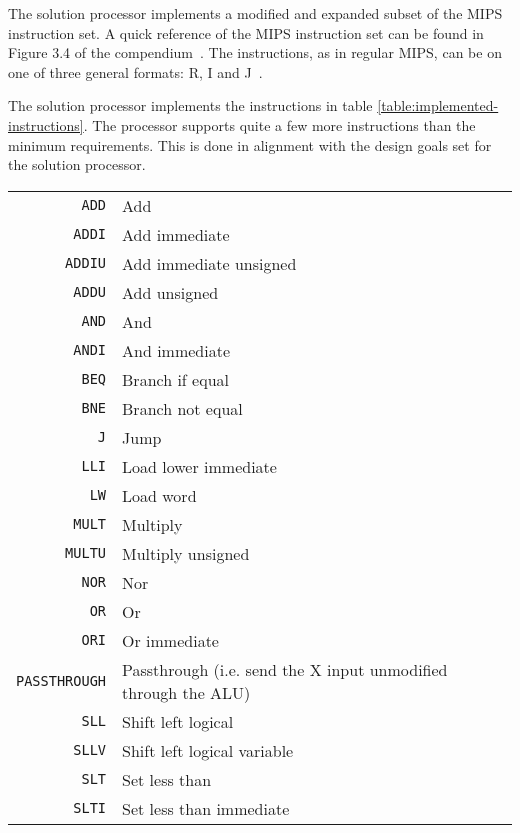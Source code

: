 The solution processor implements a modified and expanded subset of the MIPS instruction set.
A quick reference of the MIPS instruction set can be found in Figure 3.4 of the compendium~\cite[p.112]{compendium}.
The instructions, as in regular MIPS, can be on one of three general formats: R, I and J~\cite[p.109-11]{compendium}.

The solution processor implements the instructions in table \vref{table:implemented-instructions}.
The processor supports quite a few more instructions than the minimum requirements.
This is done in alignment with the design goals set for the solution processor.

\begin{table}[h]
    \begin{center}
        \begin{tabular}{r|l}
            \texttt{ADD} & Add \\
            \texttt{ADDI} & Add immediate \\
            \texttt{ADDIU} & Add immediate unsigned \\
            \texttt{ADDU} & Add unsigned \\
            \texttt{AND} & And \\
            \texttt{ANDI} & And immediate \\
            \texttt{BEQ} & Branch if equal \\
            \texttt{BNE} & Branch not equal \\
            \texttt{J} & Jump \\
            \texttt{LLI} & Load lower immediate \\
            \texttt{LW} & Load word \\
            \texttt{MULT} & Multiply \\
            \texttt{MULTU} & Multiply unsigned \\
            \texttt{NOR} & Nor \\
            \texttt{OR} & Or \\
            \texttt{ORI} & Or immediate \\
            \texttt{PASSTHROUGH} & Passthrough (i.e. send the X input unmodified through the ALU) \\
            \texttt{SLL} & Shift left logical \\
            \texttt{SLLV} & Shift left logical variable \\
            \texttt{SLT} & Set less than \\
            \texttt{SLTI} & Set less than immediate \\

\end{tabular}
\end{center}
\end{table}
